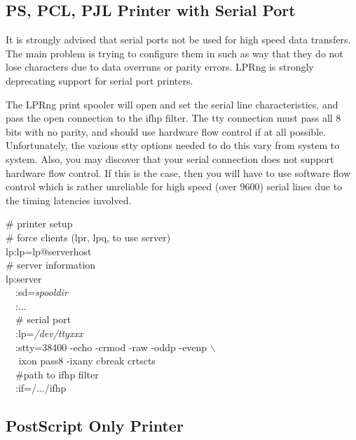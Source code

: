\documentclass[a4paper]{article}
\begin{document}
\subsection{PS, PCL, PJL Printer with Serial Port}

It is strongly advised that serial ports not be used
for high speed data transfers.
The main problem is trying to configure them in such as way
that they do not lose characters due to data overruns or parity errors.
LPRng is strongly deprecating support for serial port printers.

The LPRng print spooler will open and set the serial
line characteristics,
and pass the open connection to the
{\ttfamily ifhp} filter.
The 
{\ttfamily tty} connection must pass all 8 bits with no parity,
and should use hardware flow control if at all possible.
Unfortunately,
the various {\ttfamily stty}
options needed to do this vary from system to system.
Also, you may discover that your serial connection does not
support hardware flow control.
If this is the case,
then you will have to use software flow control
which is rather unreliable for high speed (over 9600) serial
lines due to the timing latencies involved.
\begin{tscreen}
\# printer setup  \\ 
\#  force clients (lpr, lpq, to use server)  \\ 
lp:lp=lp@serverhost  \\ 
\# server information  \\ 
lp:server  \\ 
~~:sd={\itshape spooldir\/}  \\ 
~~:...  \\ 
~~\# serial port \\ 
~~:lp={\itshape /dev/ttyxxx\/} \\ 
~~:stty=38400 -echo -crmod -raw -oddp -evenp $\backslash$ \\ 
~~   ixon pass8 -ixany cbreak crtscts \\ 
~~\#path to ifhp filter  \\ 
~~:if=/.../ifhp  \\ 
\end{tscreen}



\subsection{PostScript Only Printer
\label{psonly}}
\end{document}
